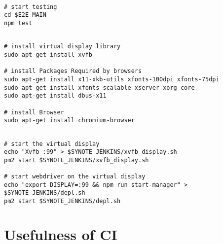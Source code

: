 \begin{listing}[H]
\begin{verbatim}

# start testing
cd $E2E_MAIN
npm test

\end{verbatim}
\label{lst:run-e2e-tests}
\end{listing}

\begin{listing}[H]
\begin{verbatim}

# install virtual display library
sudo apt-get install xvfb

# install Packages Required by browsers
sudo apt-get install x11-xkb-utils xfonts-100dpi xfonts-75dpi
sudo apt-get install xfonts-scalable xserver-xorg-core
sudo apt-get install dbus-x11

# install Browser
sudo apt-get install chromium-browser

\end{verbatim}
\label{lst:xvfb-browser-install}
\end{listing}

\begin{listing}[H]
\begin{verbatim}

# start the virtual display
echo "Xvfb :99" > $SYNOTE_JENKINS/xvfb_display.sh
pm2 start $SYNOTE_JENKINS/xvfb_display.sh

# start webdriver on the virtual display
echo "export DISPLAY=:99 && npm run start-manager" > $SYNOTE_JENKINS/depl.sh
pm2 start $SYNOTE_JENKINS/depl.sh

\end{verbatim}
\label{lst:webdriver-pm2}
\end{listing}

\section{Usefulness of CI}
\label{sec:usefulness-of-ci}

